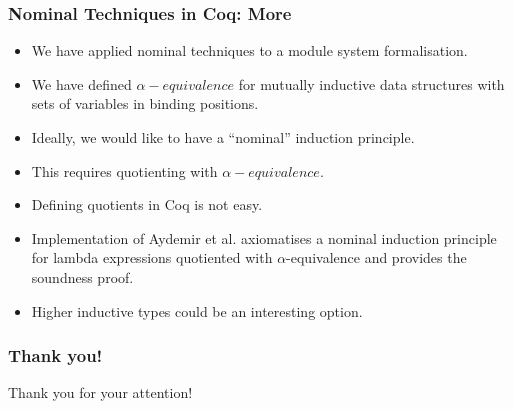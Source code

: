 \documentclass[10pt]{beamer}
\begin{document}
\begin{frame}
  \frametitle{Nominal Techniques in Coq: More}
  \begin{itemize}
  \item We have applied nominal techniques to a module system formalisation.
  \item We have defined $\alpha-equivalence$ for mutually inductive data structures
    with sets of variables in binding positions.
  \item Ideally, we would like to have a ``nominal'' induction principle.
  \item This requires quotienting with $\alpha-equivalence$.
  \item Defining quotients in Coq is not easy.
  \item Implementation of Aydemir et al. axiomatises a nominal
    induction principle for lambda expressions quotiented with
    $\alpha$-equivalence and provides the soundness proof.
  \item Higher inductive types could be an interesting option.
  \end{itemize}
\end{frame}

\begin{frame}
  \frametitle{Thank you!}
  \Large Thank you for your attention!
\end{frame}
\end{document}
